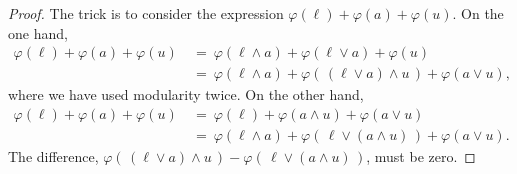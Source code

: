 \documentclass[main.tex]{subfiles}
\begin{document}
\begin{proof}
The trick is to consider the expression 
$\varphi(\ell) + \varphi(a) + \varphi(u)$.
On the one hand,
\begin{align*}
\varphi(\ell) + \varphi(a) + \varphi(u)
\ &=\ \varphi(\ell\wedge a) + \varphi(\ell \vee a) + \varphi(u) \\
\ &=\ \varphi(\ell \wedge a)
      + \varphi(\,(\ell\vee a)\wedge u\,)
      + \varphi(a\vee u),
\end{align*}
where we have used modularity twice.
On the other hand,
\begin{align*}
\varphi(\ell) + \varphi(a) + \varphi(u)
\ &=\ \varphi(\ell) + \varphi(a\wedge u) + \varphi(a \vee u) \\
\ &=\ \varphi(\ell \wedge a)
      + \varphi(\,\ell\vee (a\wedge u)\,)
      + \varphi(a\vee u).
\end{align*}
The difference,
$\varphi(\,(\ell\vee a)\wedge u\,)
- \varphi(\,\ell\vee (a\wedge u)\,)$,
must be zero.
\end{proof}
\end{document}
